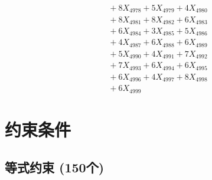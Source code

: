 \documentclass[a4paper,10pt]{article}
\begin{document}
{\begin{align}
&\;  + 8 X_{4978} + 5 X_{4979} + 4 X_{4980} \\[0.3ex]
&\;  + 8 X_{4981} + 8 X_{4982} + 6 X_{4983} \\[0.3ex]
&\;  + 6 X_{4984} + 3 X_{4985} + 5 X_{4986} \\[0.3ex]
&\;  + 4 X_{4987} + 6 X_{4988} + 6 X_{4989} \\[0.5ex]\allowbreak
&\;  + 5 X_{4990} + 4 X_{4991} + 7 X_{4992} \\[0.3ex]
&\;  + 7 X_{4993} + 6 X_{4994} + 6 X_{4995} \\[0.3ex]
&\;  + 6 X_{4996} + 4 X_{4997} + 8 X_{4998} \\[0.3ex]
&\;  + 6 X_{4999}\nonumber
\end{align}
}

\section{约束条件}

\subsection{等式约束 (150个)}
\end{document}
